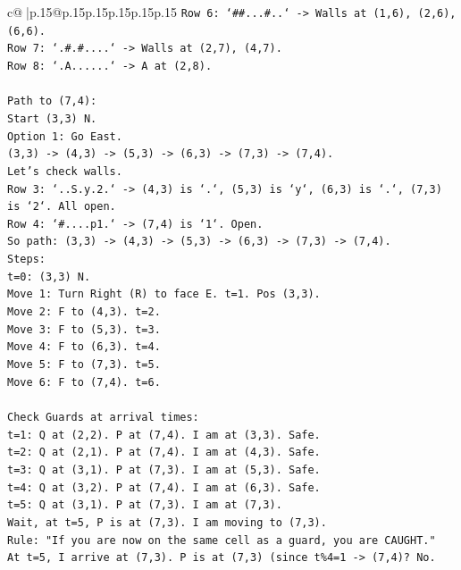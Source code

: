 \documentclass{article}
\begin{document}
{\begin{supertabular}{c@{$\;$}|p{.15\linewidth}@{}p{.15\linewidth}p{.15\linewidth}p{.15\linewidth}p{.15\linewidth}p{.15\linewidth}}
{{{\texttt{Row 6: `\#\#...\#..` {-}> Walls at (1,6), (2,6), (6,6).} \\
\texttt{Row 7: `.\#.\#....` {-}> Walls at (2,7), (4,7).} \\
\texttt{Row 8: `.A......` {-}> A at (2,8).} \\
\\ 
\texttt{Path to (7,4):} \\
\texttt{Start (3,3) N.} \\
\texttt{Option 1: Go East.} \\
\texttt{(3,3) {-}> (4,3) {-}> (5,3) {-}> (6,3) {-}> (7,3) {-}> (7,4).} \\
\texttt{Let's check walls.} \\
\texttt{Row 3: `..S.y.2.` {-}> (4,3) is `.`, (5,3) is `y`, (6,3) is `.`, (7,3) is `2`. All open.} \\
\texttt{Row 4: `\#....p1.` {-}> (7,4) is `1`. Open.} \\
\texttt{So path: (3,3) {-}> (4,3) {-}> (5,3) {-}> (6,3) {-}> (7,3) {-}> (7,4).} \\
\texttt{Steps:} \\
\texttt{t=0: (3,3) N.} \\
\texttt{Move 1: Turn Right (R) to face E. t=1. Pos (3,3).} \\
\texttt{Move 2: F to (4,3). t=2.} \\
\texttt{Move 3: F to (5,3). t=3.} \\
\texttt{Move 4: F to (6,3). t=4.} \\
\texttt{Move 5: F to (7,3). t=5.} \\
\texttt{Move 6: F to (7,4). t=6.} \\
\\ 
\texttt{Check Guards at arrival times:} \\
\texttt{t=1: Q at (2,2). P at (7,4). I am at (3,3). Safe.} \\
\texttt{t=2: Q at (2,1). P at (7,4). I am at (4,3). Safe.} \\
\texttt{t=3: Q at (3,1). P at (7,3). I am at (5,3). Safe.} \\
\texttt{t=4: Q at (3,2). P at (7,4). I am at (6,3). Safe.} \\
\texttt{t=5: Q at (3,1). P at (7,3). I am at (7,3).} \\
\texttt{Wait, at t=5, P is at (7,3). I am moving to (7,3).} \\
\texttt{Rule: "If you are now on the same cell as a guard, you are CAUGHT."} \\
\texttt{At t=5, I arrive at (7,3). P is at (7,3) (since t\%4=1 {-}> (7,4)? No.} \\
}}}
\end{supertabular}}
\end{document}
